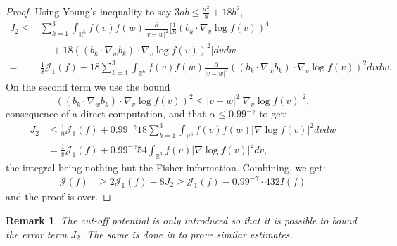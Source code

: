 \documentclass[11pt,a4paper]{article}
\theoremstyle{definition}
\theoremstyle{plain}
\newtheorem{remark}[defi]{Remark}
\begin{document}
\begin{proof}
    Using Young's inequality to say $3ab \leq \frac{a^2}{8} + 18b^2$, 
    \begin{align*}
    J_2
    \leq& \sum_{k=1}^3\int_{\mathbb{R}^{6}}f(v)f(w)  \frac{\bar{\alpha}}{\vert v - w\vert^2} \bigg[\frac{1}{8}\left( b_k\cdot \nabla_v\log f(v) \right)^4\\
    &\; \; \; \; + 18\left((b_k\cdot \nabla_w b_k)\cdot\nabla_v \log f(v)\right)^2\bigg] dvdw\\
    =&\frac{1}{8}\mathcal{J}_1(f) + 18\sum_{k=1}^3\int_{\mathbb{R}^{6}}f(v)f(w)  \frac{\bar{\alpha}}{\vert v - w\vert^2} ((b_k\cdot \nabla_w b_k)\cdot\nabla_v \log f(v))^2 dvdw.
\end{align*}
On the second term we use the bound
$$((b_k\cdot \nabla_w b_k)\cdot\nabla_v \log f(v))^2 \leq \vert v-w\vert^2 \vert \nabla_v \log f(v) \vert^2, $$consequence of a direct computation, and that $\bar{\alpha} \leq 0.99^{-\gamma}$ to get:
\begin{align*}
J_2
&\leq \frac{1}{8}\mathcal{J}_1(f)+ 0.99^{-\gamma}18\sum_{k=1}^3  \int_{\mathbb{R}^{6}}f(v)f(w)  \vert \nabla \log f(v) \vert^2 dvdw \\
&= \frac{1}{8}\mathcal{J}_1(f)+0.99^{-\gamma}54  \int_{\mathbb{R}^{3}}f(v)  \vert \nabla \log f(v) \vert^2 dv,
\end{align*}
the integral being nothing but the Fisher information. Combining, we get:
\begin{align*}
\mathcal{J}(f)&\geq 2\mathcal{J}_1(f)-8J_2\geq \mathcal{J}_1(f)-0.99^{-\gamma}\cdot 432I(f)
\end{align*}
and the proof is over.
\end{proof}
\begin{remark}
    The cut-off potential is only introduced so that it is possible to bound the error term $J_2$. The same is done in \cite{Desvillettes2014a,Ji2024} to prove similar estimates.
\end{remark}
\end{document}
